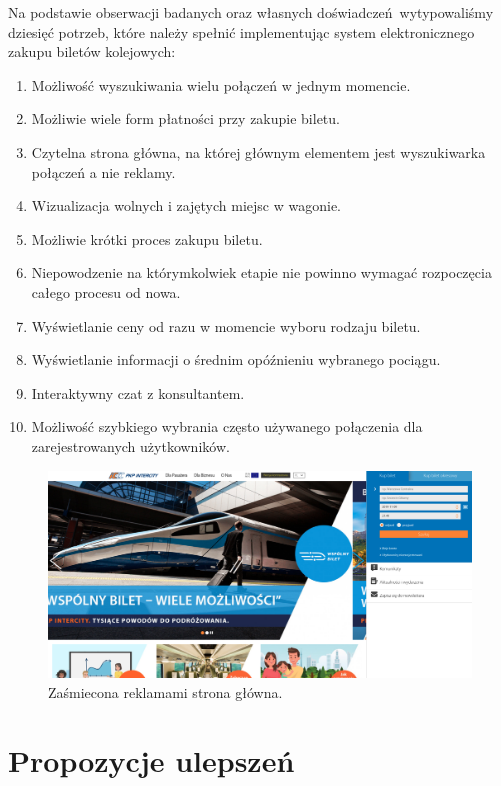 \documentclass[12pt, a4paper, oneside]{report}
\begin{document}
Na podstawie obserwacji badanych oraz własnych doświadczeń wytypowaliśmy 
dziesięć potrzeb, które należy spełnić implementując system elektronicznego 
zakupu biletów kolejowych:

\begin{enumerate}
    \item Możliwość wyszukiwania wielu połączeń w jednym momencie.
    \item Możliwie wiele form płatności przy zakupie biletu.
    \item Czytelna strona główna, na której głównym elementem jest wyszukiwarka połączeń a nie reklamy.
    \item Wizualizacja wolnych i zajętych miejsc w wagonie.
    \item Możliwie krótki proces zakupu biletu.
    \item Niepowodzenie na którymkolwiek etapie nie powinno wymagać rozpoczęcia całego procesu od nowa.
    \item Wyświetlanie ceny od razu w momencie wyboru rodzaju biletu.
    \item Wyświetlanie informacji o średnim opóźnieniu wybranego pociągu.
    \item Interaktywny czat z konsultantem.
    \item Możliwość szybkiego wybrania często używanego połączenia dla zarejestrowanych użytkowników.
\end{enumerate}

\begin{figure}[H]
    \centering
    \includegraphics[scale=0.18]{./pkp-main.png}
    \caption{Zaśmiecona reklamami strona główna.}
    \label{}
\end{figure}


\section*{Propozycje ulepszeń}
\end{document}
